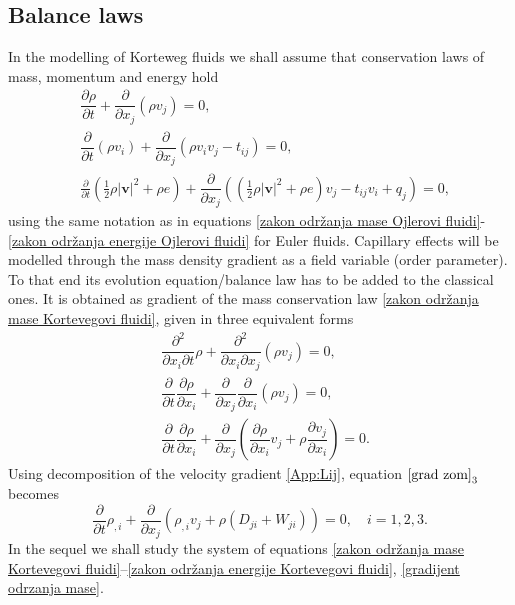 \documentclass[a4paper,fleqn]{cas-sc}
\theoremstyle{definition}
\begin{document}
\subsection{Balance laws}

In the modelling of Korteweg fluids we shall assume that conservation laws of mass, momentum and energy hold
\begin{align}
	\label{zakon održanja mase Kortevegovi fluidi}
	& \dfrac{\partial\rho}{\partial t}+\dfrac{\partial}{\partial x_j}\left(\rho v_j\right)=0, 
	\\
	\label{zakon održanja količine kretanja Kortevegovi fluidi}
	& \dfrac{\partial}{\partial t}(\rho v_i)+\dfrac{\partial}{\partial x_j}\left(\rho v_i v_j -t_{ij}\right)=0, 
	\\ 
	\label{zakon održanja energije Kortevegovi fluidi}
	& \frac{\partial}{\partial t}\left(\frac{1}{2}\rho\vert\mathbf{v}\vert ^2+\rho e\right)+\dfrac{\partial}{\partial x_j}\left(\left(\frac{1}{2}\rho\vert\mathbf{v}\vert ^2+\rho e\right)v_j-t_{ij}v_i+q_j\right)=0,
\end{align}
using the same notation as in equations \eqref{zakon održanja mase Ojlerovi fluidi}-\eqref{zakon održanja energije Ojlerovi fluidi} for Euler fluids. Capillary effects will be modelled through the mass density gradient as a field variable (order parameter). To that end its evolution equation/balance law has to be added to the classical ones. It is obtained as gradient of the mass conservation law \eqref{zakon održanja mase Kortevegovi fluidi}, given in three equivalent forms 
\begin{align}
	& \dfrac{\partial^2}{\partial x_i\partial t} \rho + \dfrac{\partial^2}{\partial x_i\partial x_j}(\rho v_j) = 0,
	\nonumber \\
	& \dfrac{\partial}{\partial t}\dfrac{\partial\rho}{\partial x_i} + \dfrac{\partial}{\partial x_j}\dfrac{\partial}{\partial x_i}(\rho v_j) = 0, 
	\label{grad zom} \\
	& \dfrac{\partial}{\partial t}\dfrac{\partial\rho}{\partial x_i} 
	+ \dfrac{\partial}{\partial x_j}\left(\dfrac{\partial\rho}{\partial x_i}v_j + \rho\dfrac{\partial v_j}{\partial x_i}\right) = 0. 
	\nonumber
\end{align}
Using decomposition of the velocity gradient \eqref{App:Lij}, equation $\eqref{grad zom}_3$ becomes
\begin{equation} \label{gradijent odrzanja mase}
	\dfrac{\partial}{\partial t}\rho_{,i}+\dfrac{\partial}{\partial x_j}(\rho_{,i}v_j+\rho (D_{ji}+W_{ji}))=0, \quad i=1,2,3.
\end{equation}
In the sequel we shall study the system of equations \eqref{zakon održanja mase Kortevegovi fluidi}--\eqref{zakon održanja energije Kortevegovi fluidi}, \eqref{gradijent odrzanja mase}. 
\end{document}
